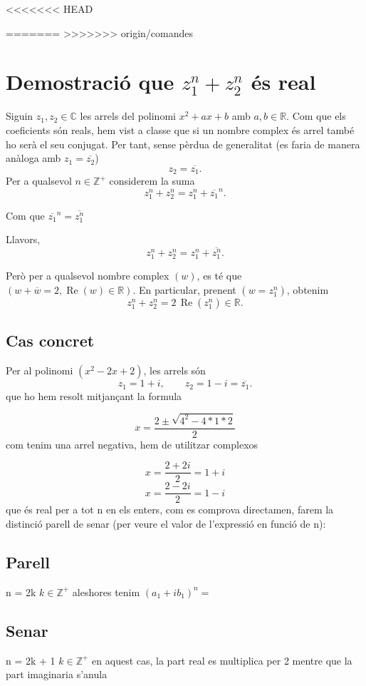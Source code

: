 <<<<<<< HEAD

=======
>>>>>>> origin/comandes
\section*{Demostració que \(z_1^n + z_2^n\) és real}

Siguin $z_1, z_2 \in \mathbb{C}$ les arrels del polinomi
$x^2 + ax + b$
amb $a, b \in \mathbb{R}$. Com que els coeficients són reals, hem vist a classe que si un nombre complex és arrel també ho serà el seu conjugat. Per tant, sense pèrdua de generalitat (es faria de manera anàloga amb $z_1 = \overline{z_2}$)
\begin{equation*}
z_2 = \overline{z_1}.
\end{equation*}
Per a qualsevol $n\in \mathbb{Z^+}$ considerem la suma
\begin{equation*}
z_1^n + z_2^n = z_1^n + \overline{z_1}^n.
\end{equation*}

Com que $\overline{z_1}^n = \overline{z_1^n}$


Llavors,
\begin{equation*}
z_1^n + z_2^n = z_1^n + \overline{z_1^n}.
\end{equation*}

Però per a qualsevol nombre complex $(w)$, es té que $(w + \overline{w} = 2,\operatorname{Re}(w) \in \mathbb{R})$. En particular, prenent $(w = z_1^n)$, obtenim
\begin{equation*}
z_1^n + z_2^n = 2\,\operatorname{Re}(z_1^n) \in \mathbb{R}.
\end{equation*}

\subsection*{Cas concret}
Per al polinomi $(x^2 - 2x + 2)$, les arrels són
\begin{equation*}
z_1 = 1 + i, \qquad z_2 = 1 - i = \overline{z_1}.
\end{equation*}
que ho hem resolt mitjançant la formula 

\begin{equation*}
x = \frac{2 \pm \sqrt{4^2 -4*1*2}}{2}
\end{equation*}
com tenim una arrel negativa, hem de utilitzar complexos
\newline

\begin{equation*}
x = \frac{2 + 2i}{2} = 1 + i
\end{equation*}
\newline
\begin{equation*}
x = \frac{2 - 2i}{2} = 1 - i
\end{equation*}
\newline
que és real per a tot n en els enters, com es comprova directamen, farem la distinció parell de senar (per veure el valor de l'expressió en funció de n):
\subsection*{Parell}

n = 2k \(k \in \mathbb{Z}^+\)
aleshores tenim $(a_1 + ib_1)^n = $

\subsection*{Senar}

n = 2k + 1 \(k \in \mathbb{Z}^+\)
en aquest cas, la part real es multiplica per 2 mentre que la part imaginaria s'anula